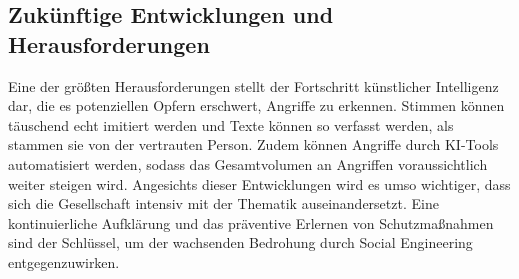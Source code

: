 \documentclass[12pt, a4paper, oneside]{scrartcl}
\begin{document}
\subsection{Zukünftige Entwicklungen und Herausforderungen}
Eine der größten Herausforderungen stellt der Fortschritt künstlicher Intelligenz dar, die es potenziellen Opfern 
erschwert, Angriffe zu erkennen. Stimmen können
täuschend echt imitiert werden und Texte können so verfasst werden, als stammen sie von der vertrauten Person.
Zudem können Angriffe durch KI-Tools automatisiert werden, sodass das Gesamtvolumen an Angriffen voraussichtlich weiter
steigen wird. 
Angesichts dieser Entwicklungen wird es umso wichtiger, dass sich die Gesellschaft intensiv mit der Thematik auseinandersetzt.
Eine kontinuierliche Aufklärung und das präventive Erlernen von Schutzmaßnahmen sind der Schlüssel, um der wachsenden 
Bedrohung durch Social Engineering entgegenzuwirken.

\clearpage
\printbibliography[title={Literaturverzeichnis}]
\end{document}
